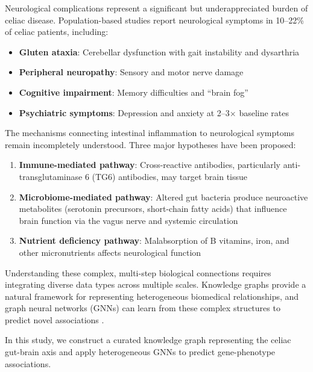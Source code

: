 \documentclass[12pt]{article}
\begin{document}
Neurological complications represent a significant but underappreciated burden of celiac disease. Population-based studies report neurological symptoms in 10--22\% of celiac patients, including:

\begin{itemize}
    \item \textbf{Gluten ataxia}: Cerebellar dysfunction with gait instability and dysarthria
    \item \textbf{Peripheral neuropathy}: Sensory and motor nerve damage
    \item \textbf{Cognitive impairment}: Memory difficulties and ``brain fog''
    \item \textbf{Psychiatric symptoms}: Depression and anxiety at 2--3$\times$ baseline rates
\end{itemize}

The mechanisms connecting intestinal inflammation to neurological symptoms remain incompletely understood. Three major hypotheses have been proposed:

\begin{enumerate}
    \item \textbf{Immune-mediated pathway}: Cross-reactive antibodies, particularly anti-transglutaminase 6 (TG6) antibodies, may target brain tissue \citep{hadjivassiliou2008autoantibodies}
    
    \item \textbf{Microbiome-mediated pathway}: Altered gut bacteria produce neuroactive metabolites (serotonin precursors, short-chain fatty acids) that influence brain function via the vagus nerve and systemic circulation \citep{dinan2017gutbrain}
    
    \item \textbf{Nutrient deficiency pathway}: Malabsorption of B vitamins, iron, and other micronutrients affects neurological function
\end{enumerate}

Understanding these complex, multi-step biological connections requires integrating diverse data types across multiple scales. Knowledge graphs provide a natural framework for representing heterogeneous biomedical relationships, and graph neural networks (GNNs) can learn from these complex structures to predict novel associations \citep{zhang2022graph}.

In this study, we construct a curated knowledge graph representing the celiac gut-brain axis and apply heterogeneous GNNs to predict gene-phenotype associations.
\end{document}
